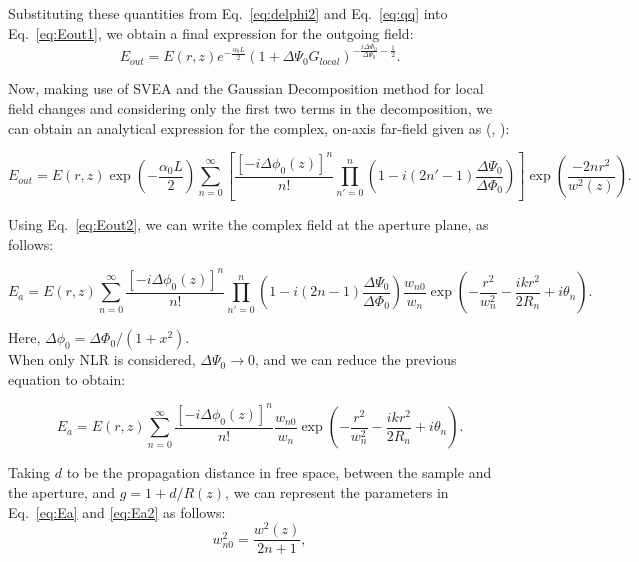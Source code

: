 \documentclass[%
 reprint,
amsmath,
amssymb,
10pt
]{revtex4-2}
\begin{document}
Substituting these quantities from Eq.~\ref{eq:delphi2} and Eq.~\ref{eq:qq} into Eq.~\ref{eq:Eout1}, we obtain a final expression for the outgoing field:
\begin{equation}
    E_{out} = E(r, z)e^{-\frac{\alpha_0 L}{2}}(1 + \Delta\Psi_0 G_{local})^{-\frac{i\Delta\Phi_0}{\Delta\Psi_0} - \frac{1}{2}}.
    \label{eq:EFinal}
\end{equation}

Now, making use of SVEA and the Gaussian Decomposition method for local field changes and considering only the first two terms in the decomposition, we can obtain an analytical expression for the complex, on-axis far-field given as (\cite{bahae}, \cite{calc}):
\begin{widetext}
\begin{equation}
    \boxed{
    E_{out} = E(r, z)\exp\left(-\frac{\alpha_0 L}{2}\right)  \sum_{n = 0}^\infty\left[ \frac{[-i\Delta\phi_0(z)]^n}{n!} \prod_{n' = 0}^{n}\left(1 - i(2n' - 1)\frac{\Delta\Psi_0}{\Delta\Phi_0}\right)\right] \exp\left(\frac{-2nr^2}{w^2(z)}\right)
    }.
    \label{eq:Eout2}
\end{equation}
\end{widetext}

Using Eq.~\ref{eq:Eout2}, we can write the complex field at the aperture plane, as follows:
\begin{widetext}
\begin{equation}
    \boxed{
    E_a = E(r, z)\sum_{n = 0}^\infty \frac{[-i\Delta\phi_0(z)]^n}{n!} \prod_{n' = 0}^{n}\left(1 - i(2n - 1)\frac{\Delta\Psi_0}{\Delta\Phi_0}\right)\frac{w_{n0}}{w_n}\exp\left(-\frac{r^2}{w_n^2} - \frac{ikr^2}{2R_n} + i \theta_n\right)
    }.
    \label{eq:Ea}
\end{equation}
\end{widetext}
Here, $\Delta\phi_0 = \Delta\Phi_0 / (1 + x^2)$.\\

When only NLR is considered, $\Delta\Psi_0 \to 0$, and we can reduce the previous equation to obtain:
\begin{widetext}
\begin{equation}
    \boxed{
    E_a = E(r, z)\sum_{n = 0}^\infty \frac{[-i\Delta\phi_0(z)]^n}{n!}\frac{w_{n0}}{w_n}\exp\left(-\frac{r^2}{w_n^2} - \frac{ikr^2}{2R_n} + i \theta_n\right)
    }.
    \label{eq:Ea2}
\end{equation}
\end{widetext}
Taking $d$ to be the propagation distance in free space, between the sample and the aperture, and $g = 1 + d / R(z)$, we can represent the parameters in Eq.~\ref{eq:Ea} and \ref{eq:Ea2} as follows:
\begin{equation*}
    w_{n0}^2 = \frac{w^2(z)}{2n + 1},
    \label{eq:wn0}
\end{equation*}
\end{document}
